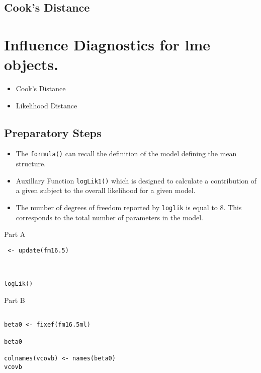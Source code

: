 \documentclass[a4paper,12pt]{article}
\begin{document}
\subsection{Cook's Distance}



\section{Influence Diagnostics for lme objects.}

\begin{itemize}
\item Cook's Distance
\item Likelihood Distance
\end{itemize}

\subsection{Preparatory Steps}

\begin{itemize}
\item The \texttt{formula()} can recall the definition of the model defining the mean structure.

\item Auxillary Function \texttt{logLik1()} which is designed to calculate a contribution of a given subject to the overall likelihood for a given model.

\item 
The number of degrees of freedom reported by \texttt{loglik} is equal to 8. This corresponds
to the total number of parameters in the model.
\end{itemize}

Part A
\begin{framed}
\begin{verbatim}
 <- update(fm16.5)


  
logLik()
\end{verbatim}
\end{framed}


Part B

\begin{framed}
\begin{verbatim}

beta0 <- fixef(fm16.5ml)

beta0

colnames(vcovb) <- names(beta0)
vcovb

\end{verbatim}
\end{framed}
\end{document}

